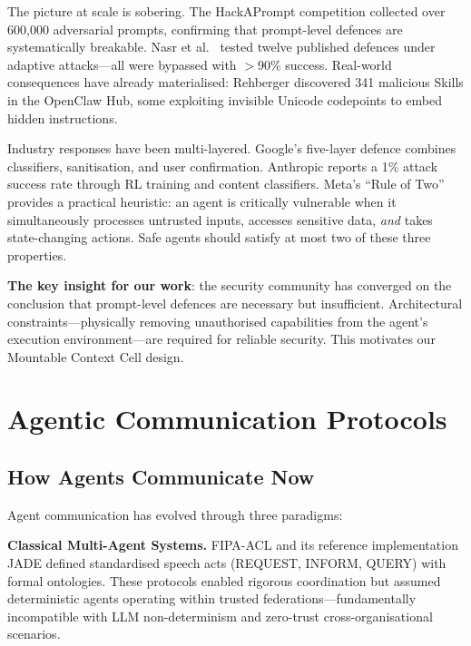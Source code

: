 The picture at scale is sobering. The HackAPrompt competition \cite{schulhoff2024hackaprompt} collected over 600,000 adversarial prompts, confirming that prompt-level defences are systematically breakable. Nasr et al.\ \cite{nasr2025attacker} tested twelve published defences under adaptive attacks---all were bypassed with $>$90\% success. Real-world consequences have already materialised: Rehberger \cite{rehberger2026scaryskills} discovered 341 malicious Skills in the OpenClaw Hub, some exploiting invisible Unicode codepoints to embed hidden instructions.

Industry responses have been multi-layered. Google's five-layer defence \cite{google2025promptinjection} combines classifiers, sanitisation, and user confirmation. Anthropic \cite{anthropic2025promptinjection} reports a 1\% attack success rate through RL training and content classifiers. Meta's ``Rule of Two'' \cite{meta2025ruletwo} provides a practical heuristic: an agent is critically vulnerable when it simultaneously processes untrusted inputs, accesses sensitive data, \textit{and} takes state-changing actions. Safe agents should satisfy at most two of these three properties.

\textbf{The key insight for our work}: the security community has converged on the conclusion that prompt-level defences are necessary but insufficient. Architectural constraints---physically removing unauthorised capabilities from the agent's execution environment---are required for reliable security. This motivates our Mountable Context Cell design.


\section{Agentic Communication Protocols}
\label{sec:rw_communication}

\subsection{How Agents Communicate Now}

Agent communication has evolved through three paradigms:

\textbf{Classical Multi-Agent Systems.} FIPA-ACL \cite{fipa2002acl} and its reference implementation JADE \cite{bellifemine2007jade} defined standardised speech acts (REQUEST, INFORM, QUERY) with formal ontologies. These protocols enabled rigorous coordination but assumed deterministic agents operating within trusted federations---fundamentally incompatible with LLM non-determinism and zero-trust cross-organisational scenarios.

